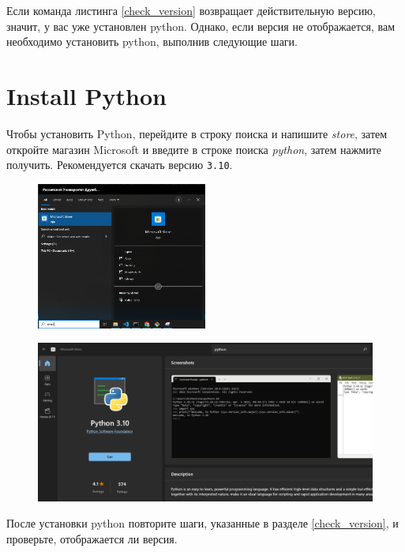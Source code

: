 \documentclass[12pt]{article}
\begin{document}
Если команда листинга \ref{check_version} возвращает действительную версию, значит, у вас уже установлен python.
Однако, если версия не отображается, вам необходимо установить python, выполнив следующие шаги.

\section{Install Python}

Чтобы установить Python, перейдите в строку поиска и напишите \emph{store}, затем откройте магазин Microsoft и введите в строке поиска \emph{python},
затем нажмите получить. Рекомендуется скачать версию \texttt{3.10}.

\begin{figure}[H]
	\centering
	\includegraphics[width=0.5\textwidth ,keepaspectratio]{imgs/open_store.png}
	\caption{}
\end{figure}


\begin{figure}[H]
	\centering
	\includegraphics[width =1\textwidth ,keepaspectratio]{imgs/install_from_store.png}
	\caption{}
\end{figure}

После установки python повторите шаги, указанные в разделе \ref{check_version}, и проверьте, отображается ли версия.
\end{document}
